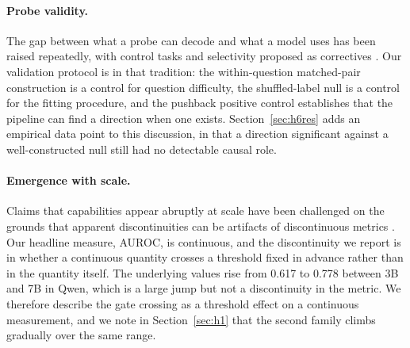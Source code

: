 \paragraph{Probe validity.}
The gap between what a probe can decode and what a model uses has been raised repeatedly,
with control tasks and selectivity proposed as correctives \citep{hewitt2019control, belinkov2022probing}.
Our validation protocol is in that tradition: the within-question matched-pair construction
is a control for question difficulty, the shuffled-label null is a control for the fitting
procedure, and the pushback positive control establishes that the pipeline can find a
direction when one exists. Section~\ref{sec:h6res} adds an empirical data point to this
discussion, in that a direction significant against a well-constructed null still had no
detectable causal role.

\paragraph{Emergence with scale.}
Claims that capabilities appear abruptly at scale \citep{wei2022emergent} have been challenged on
the grounds that apparent discontinuities can be artifacts of discontinuous metrics
\citep{schaeffer2023mirage}. Our headline measure, AUROC, is continuous, and the discontinuity we
report is in whether a continuous quantity crosses a threshold fixed in advance rather than
in the quantity itself. The underlying values rise from 0.617 to 0.778 between 3B and 7B in
Qwen, which is a large jump but not a discontinuity in the metric. We therefore describe the
gate crossing as a threshold effect on a continuous measurement, and we note in
Section~\ref{sec:h1} that the second family climbs gradually over the same range.
